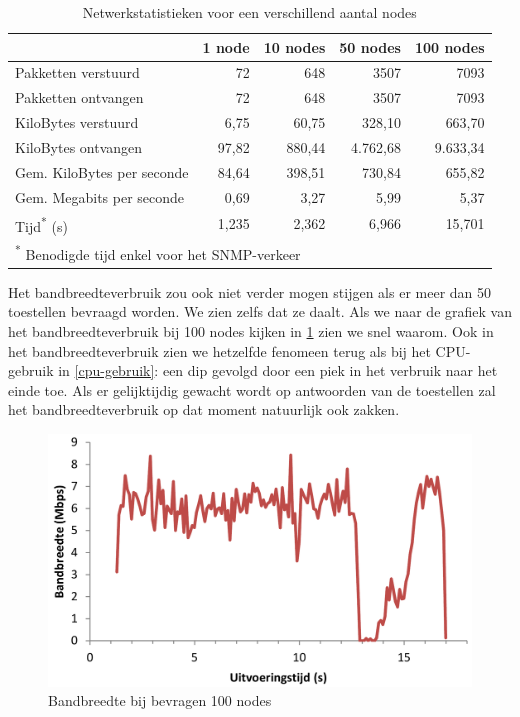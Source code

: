 \begin{table}[h]
\centering
\begin{tabular}{@{}lrrrr@{}}
\toprule
                           & 1 node & 10 nodes & 50 nodes & 100 nodes \\ \midrule
Pakketten verstuurd        & 72     & 648      & 3507     & 7093      \\
Pakketten ontvangen        & 72     & 648      & 3507     & 7093      \\
KiloBytes verstuurd        & 6,75   & 60,75    & 328,10   & 663,70    \\
KiloBytes ontvangen        & 97,82  & 880,44   & 4.762,68  & 9.633,34   \\
Gem. KiloBytes per seconde & 84,64  & 398,51   & 730,84   & 655,82    \\
Gem. Megabits per seconde  & 0,69   & 3,27     & 5,99     & 5,37      \\
Tijd\textsuperscript{*} (s)& 1,235  & 2,362    & 6,966    & 15,701    \\ \midrule[.5pt]
\multicolumn{4}{l}{\textsuperscript{*} \footnotesize{Benodigde tijd enkel voor het SNMP-verkeer}}
\end{tabular}
\caption{Netwerkstatistieken voor een verschillend aantal nodes}
\label{tabel-bandbreedte-aantalnodes}
\end{table}

\begin{minipage}{\textwidth}
Het bandbreedteverbruik zou ook niet verder mogen stijgen als er meer dan 50 toestellen bevraagd worden.
We zien zelfs dat ze daalt.
Als we naar de grafiek van het bandbreedteverbruik bij 100 nodes kijken in \cref{fig-bandbreedte-100-nodes}
zien we snel waarom.
Ook in het bandbreedteverbruik zien we hetzelfde fenomeen terug als bij het CPU-gebruik in \cref{cpu-gebruik}:
een dip gevolgd door een piek in het verbruik naar het einde toe.
Als er gelijktijdig gewacht wordt op antwoorden van de toestellen zal het bandbreedteverbruik op dat moment natuurlijk ook zakken.
\end{minipage}

\begin{figure}[h]
	\centering
	\includegraphics[scale=0.40]{figures/bandbreedte/bandbreedte-100nodes}
	\caption{Bandbreedte bij bevragen 100 nodes}
	\label{fig-bandbreedte-100-nodes}
\end{figure}

